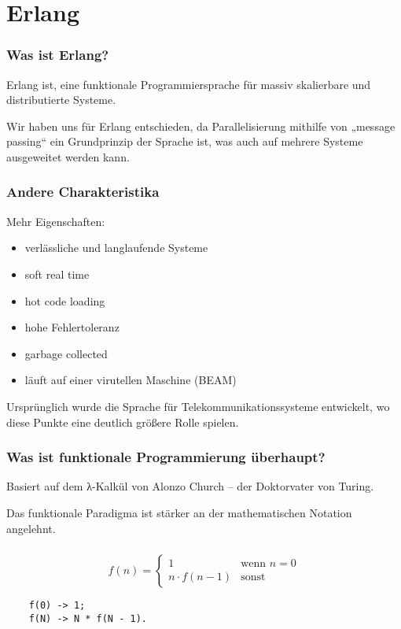 \documentclass[compress]{beamer}
\begin{document}

\section{Erlang}
\label{sec:erlang}

\begin{frame}
  \frametitle{Was ist Erlang?}

  Erlang ist, eine funktionale Programmiersprache für massiv
  skalierbare und distributierte Systeme.

  Wir haben uns für Erlang entschieden, da Parallelisierung mithilfe
  von „message passing“ ein Grundprinzip der Sprache ist, was auch auf
  mehrere Systeme ausgeweitet werden kann.
\end{frame}

\begin{frame}
  \frametitle{Andere Charakteristika}

  Mehr Eigenschaften:

  \begin{itemize}
  \item verlässliche und langlaufende Systeme
  \item soft real time
  \item hot code loading
  \item hohe Fehlertoleranz
  \item garbage collected
  \item läuft auf einer virutellen Maschine (BEAM)
  \end{itemize}

  Ursprünglich wurde die Sprache für Telekommunikationssysteme
  entwickelt, wo diese Punkte eine deutlich größere Rolle spielen.
\end{frame}

\begin{frame}
  \frametitle{Was ist funktionale Programmierung überhaupt?}

  Basiert auf dem λ-Kalkül von Alonzo Church – der Doktorvater von
  Turing.

  Das funktionale Paradigma ist stärker an der mathematischen Notation
  angelehnt.
\end{frame}

\begin{frame}[fragile]
  \frametitle{}
  $$
  f(n) =
  \begin{cases}
    1             &\textrm{wenn } n = 0 \\
    n \cdot f(n - 1) & \textrm{sonst}
  \end{cases}
  $$
  \vfill

  \begin{lstlisting}
    f(0) -> 1;
    f(N) -> N * f(N - 1).
  \end{lstlisting}
\end{frame}
\end{document}
